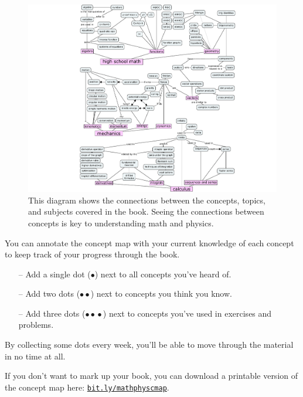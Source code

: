 
\cleardoublepage
\thispagestyle{plain}

\begin{figure}[H]
	\centering
	\hspace*{-1mm}\includegraphics[width=1.06\textwidth]{figures/concept_maps/concept_map_full3.pdf}
	\caption{	This diagram shows the connections between the concepts, topics, and subjects covered in the book.
			Seeing the connections between concepts is key to understanding math and physics.}
	\label{fig:big_concept_map}
\end{figure}


\clearpage
\vspace*{5mm}
\noindent
You can annotate the concept map with your current knowledge of each concept to keep track of your progress through the book.
\begin{itemize}
	\item[--] Add a single dot ($\bullet$) next to all concepts you've heard of.
	\item[--] Add two dots ($\bullet\bullet$) next to concepts you think you know.
	\item[--] Add three dots ($\bullet\!\bullet\!\bullet$) next to concepts you've used in exercises and problems.
\end{itemize}
By collecting some dots every week,
you'll be able to move through the material in no time at all.

\bigskip
If you don't want to mark up your book,
you can download a printable version of the concept map here: 
\href{https://bit.ly/mathphyscmap}{\texttt{bit.ly/mathphyscmap}}.


\clearpage
\thispagestyle{plain}

